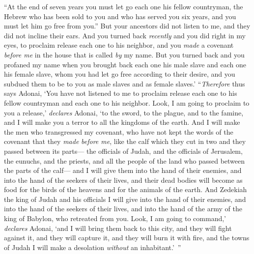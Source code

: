\begin{biblechapter}
\verse “At the end of seven years you must let go each one his fellow countryman, the Hebrew who has been sold to you and who has served you six years, and you must let him go free from you.” But your ancestors did not listen to me, and they did not incline their ears.
\verse And you turned back \textit{recently} and you did right in my eyes, to proclaim release each one to his neighbor, and you \textit{made} a covenant \textit{before me} in the house that is called \textit{by} my name.
\verse But you turned back and you profaned my name when you brought back each one his male slave and each one his female slave, whom you had let go free according to their desire, and you subdued them to be to you as male slaves and as female slaves.’
\verse “\textit{Therefore} thus says Adonai, ‘You have not listened to me to proclaim release each one to his fellow countryman and each one to his neighbor. Look, I am going to proclaim to you a release,’ \textit{declares} Adonai, ‘to the sword, to the plague, and to the famine, and I will make you a terror to all the kingdoms of the earth.
\verse And I will make the men who transgressed my covenant, who have not kept the words of the covenant that they \textit{made} \textit{before me}, like the calf which they cut in two and they passed between its parts—
\verse the officials of Judah, and the officials of Jerusalem, the eunuchs, and the priests, and all the people of the land who passed between the parts of the calf—
\verse and I will give them into the hand of their enemies, and into the hand of the seekers of their lives, and their dead bodies will become as food for the birds of the heavens and for the animals of the earth.
\verse And Zedekiah the king of Judah and his officials I will give into the hand of their enemies, and into the hand of the seekers of their lives, and into the hand of the army of the king of Babylon, who retreated from you.
\verse Look, I am going to command,’ \textit{declares} Adonai, ‘and I will bring them back to this city, and they will fight against it, and they will capture it, and they will burn it with fire, and the towns of Judah I will make a desolation \textit{without} an inhabitant.’ ”
\end{biblechapter}

